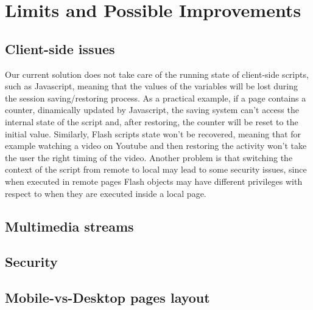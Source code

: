 \documentclass[11pt,a4paper]{article}
\begin{document}
\section{Limits and Possible Improvements}
\subsection{Client-side issues}
Our current solution does not take care of the running state of client-side scripts, such as Javascript, meaning that the values of the variables will be lost during the session saving/restoring process. As a practical example, if a page contains a counter, dinamically updated by Javascript, the saving system can’t access the internal state of the script and, after restoring, the counter will be reset to the initial value. Similarly, Flash scripts state won’t be recovered, meaning that for example watching a video on Youtube and then restoring the activity won’t take the user the right timing of the video.
Another problem is that switching the context of the script from remote to local may lead to some security issues, since when executed in remote pages Flash objects may have different privileges with respect to when they are executed inside a local page.

\subsection{Multimedia streams}
\subsection{Security}
\subsection{Mobile-vs-Desktop pages layout}
\end{document}
